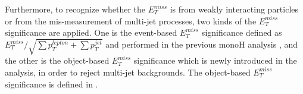 \documentclass[class=NTHU_thesis, crop=false]{standalone}
\begin{document}
Furthermore, to recognize whether the $E^{miss}_T$ is from weakly interacting particles or from the mis-measurement of multi-jet processes, two kinds of the $E^{miss}_T$ significance are applied. One is the event-based $E^{miss}_T$ significance defined as $E^{miss}_T/\sqrt{{\sum}p^{lepton}_T+{\sum}p^{jet}_T}$ and performed in the previous monoH analysis \cite{Meehan:2225941}, and the other is the object-based $E^{miss}_T$ significance which is newly introduced in the analysis, in order to reject multi-jet backgrounds. The object-based $E^{miss}_T$ significance is defined in \cite{ATLAS-CONF-2018-038}.
\end{document}

